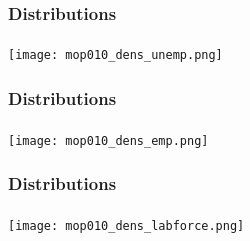 \begin{frame}

    \label{dist_2}
    
    \frametitle{Distributions} %
    \framesubtitle{}  %
    \rmfamily %

    \begin{center}
        \texttt{[image: mop010\_dens\_unemp.png]}
    \end{center}
    
    \hyperlink{unemp_result}{}
    
\end{frame}

\begin{frame}

    \label{dist_3}
    
    \frametitle{Distributions} %
    \framesubtitle{}  %
    \rmfamily %

    \begin{center}
        \texttt{[image: mop010\_dens\_emp.png]}
    \end{center}
    
    \hyperlink{emp_result}{}
    
\end{frame}

\begin{frame}

    \label{dist_4}
    
    \frametitle{Distributions} %
    \framesubtitle{}  %
    \rmfamily %

    \begin{center}
        \texttt{[image: mop010\_dens\_labforce.png]}
    \end{center}
    
    \hyperlink{labforce_result}{}
    
\end{frame}

